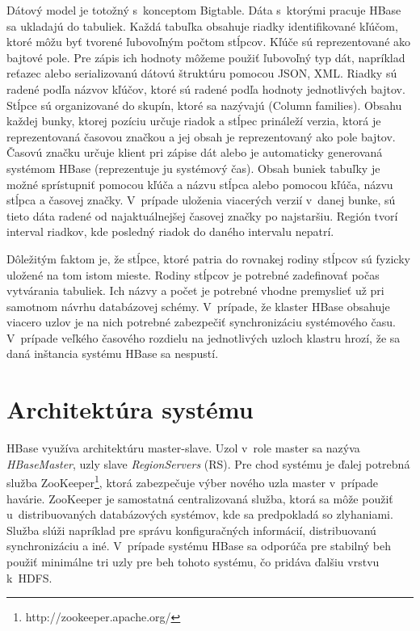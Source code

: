 \documentclass[11pt,twoside,a4paper]{book}
\begin{document}
Dátový model je totožný s~konceptom Bigtable. Dáta s~ktorými pracuje HBase sa ukladajú do tabuliek. Každá tabuľka obsahuje riadky identifikované kľúčom, ktoré môžu byť tvorené ľubovoľným počtom stĺpcov. Kľúče sú reprezentované ako bajtové pole. Pre zápis ich hodnoty môžeme použiť ľubovoľný typ dát, napríklad reťazec alebo serializovanú dátovú štruktúru pomocou JSON, XML. Riadky sú radené podľa názvov kľúčov, ktoré sú radené podľa hodnoty jednotlivých bajtov. Stĺpce sú organizované do skupín, ktoré sa nazývajú  (Column families). Obsahu každej bunky, ktorej pozíciu určuje riadok a stĺpec prináleží verzia, ktorá je reprezentovaná časovou značkou a jej obsah je reprezentovaný ako pole bajtov. Časovú značku určuje klient pri zápise dát alebo je automaticky generovaná systémom HBase (reprezentuje ju systémový čas). Obsah buniek tabuľky je možné sprístupniť pomocou kľúča a názvu stĺpca alebo pomocou kľúča, názvu stĺpca a časovej značky. V~prípade uloženia viacerých verzií v~danej bunke, sú tieto dáta radené od najaktuálnejšej časovej značky po najstaršiu. Región tvorí interval riadkov, kde posledný riadok do daného intervalu nepatrí.

Dôležitým faktom je, že stĺpce, ktoré patria do rovnakej rodiny stĺpcov sú fyzicky uložené na tom istom mieste. Rodiny stĺpcov je potrebné zadefinovať počas vytvárania tabuliek. Ich názvy a počet je potrebné vhodne premyslieť už pri samotnom návrhu databázovej schémy. V~prípade, že klaster HBase obsahuje viacero uzlov je na nich potrebné zabezpečiť synchronizáciu systémového času. V~prípade veľkého časového rozdielu na jednotlivých uzloch klastru hrozí, že sa daná inštancia systému HBase sa nespustí.


\section{Architektúra systému}

HBase využíva architektúru master-slave. Uzol v~role master sa nazýva \emph{HBaseMaster}, uzly slave \emph{RegionServers} (RS). Pre chod systému je ďalej potrebná služba ZooKeeper\footnote{http://zookeeper.apache.org/}, ktorá zabezpečuje výber nového uzla master v~prípade havárie. ZooKeeper je samostatná centralizovaná služba, ktorá sa môže použiť u~distribuovaných databázových systémov, kde sa predpokladá so zlyhaniami. Služba slúži napríklad pre správu konfiguračných informácií, distribuovanú synchronizáciu a iné. V~prípade systému HBase sa odporúča pre stabilný beh použiť minimálne tri uzly pre beh tohoto systému, čo pridáva ďalšiu vrstvu k~HDFS.
\end{document}
